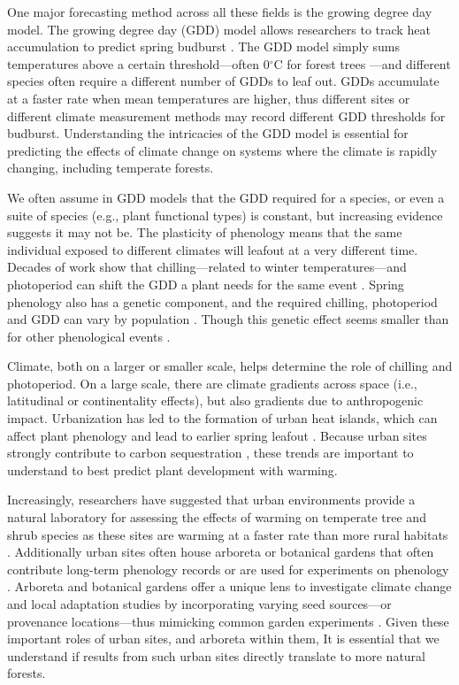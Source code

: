 \documentclass{article}\usepackage[]{graphicx}\usepackage[]{color}
\begin{document}
One major forecasting method across all these fields is the growing degree day model. The growing degree day (GDD) model allows researchers to track heat accumulation to predict spring budburst \citep{Cook2012,Crimmins2020,Phillimore2013,Schwartz2006,Vitasse2011}. The GDD model simply sums temperatures above a certain threshold---often 0$^{\circ}$C for forest trees  \citep[as estimates are proven to be more accurate,][]{Man2010}---and different species often require a different number of GDDs to leaf out. GDDs accumulate at a faster rate when mean temperatures are higher, thus different sites or different climate measurement methods may record different GDD thresholds for budburst. Understanding the intricacies of the GDD model is essential for predicting the effects of climate change on systems where the climate is rapidly changing, including temperate forests. 
  
We often assume in GDD models that the GDD required for a species, or even a suite of species (e.g., plant functional types) is constant, but increasing evidence suggests it may not be. The plasticity of phenology means that the same individual exposed to different climates will leafout at a very different time. Decades of work show that chilling---related to winter temperatures---and photoperiod can shift the GDD a plant needs for the same event \citep{Basler2012,Chuine2010,Zohner2016}. Spring phenology also has a genetic component, and the required chilling, photoperiod and GDD can vary by population \citep{Scotti2004,Cuervo-Alarcon2018}. Though this genetic effect seems smaller than for other phenological events \citep{McKown2013,Satake2013}.

Climate, both on a larger or smaller scale, helps determine the role of chilling and photoperiod. On a large scale, there are climate gradients across space (i.e., latitudinal or continentality effects), but also gradients due to anthropogenic impact. Urbanization has led to the formation of urban heat islands, which can affect plant phenology and lead to earlier spring leafout \citep{Meng2020}. Because urban sites strongly contribute to carbon sequestration \citep{Ziter2018}, these trends are important to understand to best predict plant development with warming. 
  
Increasingly, researchers have suggested that urban environments provide a natural laboratory for assessing the effects of warming on temperate tree and shrub species as these sites are warming at a faster rate than more rural habitats \citep{Pickett2011, Grimm2008}. Additionally urban sites often house arboreta or botanical gardens that often contribute long-term phenology records \citep{Zohner2014} or are used for experiments on phenology \citep{Ettinger2018}. Arboreta and botanical gardens offer a unique lens to investigate climate change and local adaptation studies by incorporating varying seed sources---or provenance locations---thus mimicking common garden experiments \citep{Primack2009}. Given these important roles of urban sites, and arboreta within them, It is essential that we understand if results from such urban sites directly translate to more natural forests. 
  
\end{document}
